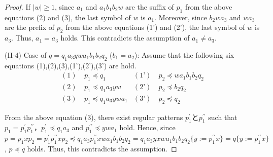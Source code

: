 \begin{proof}
\noindent
If $|w| \ge 1$, since $a_{1}$ and $a_{1}b_{1}b_{2}w$ are the suffix of $p_{1}$ from the above equations (2) and (3),
the last symbol of $w$ is $a_{1}$.
Moreover, since $b_{2}wa_{3}$ and $wa_{3}$ are the prefix of $p_{2}$ from the above equations (1') and (2'),
the last symbol of $w$ is $a_{3}$.
Thus, $a_{1}=a_{3}$ holds.
This contradicts the assumption of $a_{1} \ne a_{3}$.
\smallskip

\noindent
(II-4) Case of $q=q_{1}a_{3}ywa_{1}b_{1}b_{2}q_{2}$ ($b_{1}=a_{2}$):
Assume that the following six equations (1),(2),(3),(1'),(2'),(3') are hold.
\begin{align*}
(1)~& p_{1} \preceq q_{1} & (\text{1'})~& p_{2} \preceq wa_{1}b_{1}b_{2}q_{2} \\
(2)~& p_{1} \preceq q_{1}a_{3}yw & (\text{2'})~& p_{2} \preceq b_{2}q_{2} \\
(3)~& p_{1} \preceq q_{1}a_{3}ywa_{1} & (\text{3'})~& p_{2} \preceq q_{2}
\end{align*}

\noindent
From the above equation (3), there exist regular patterns $p_{1}^{\prime}$と$p_{1}^{\prime\prime}$ such that $p_{1}=p_{1}^{\prime}p_{1}^{\prime\prime}$，$p_{1}^{\prime} \preceq q_{1}a_{3}$ and $p_{1}^{\prime\prime} \preceq ywa_{1}$ hold.
Hence, since $p=p_{1}xp_{2}=p_{1}^{\prime}p_{1}^{\prime\prime}xp_{2}\preceq q_{1}a_{3}p_{1}^{\prime\prime}xwa_{1}b_{1}b_{2}q_{2}=q_{1}a_{3}yxwa_{1}b_{1}b_{2}q_{2}\{ y := p_{1}^{\prime\prime}x \}=q \{ y := p_{1}^{\prime\prime}x \}$, $p \preceq q$ holds.
Thus, this contradicts the assumption.
\smallskip


\end{proof}
